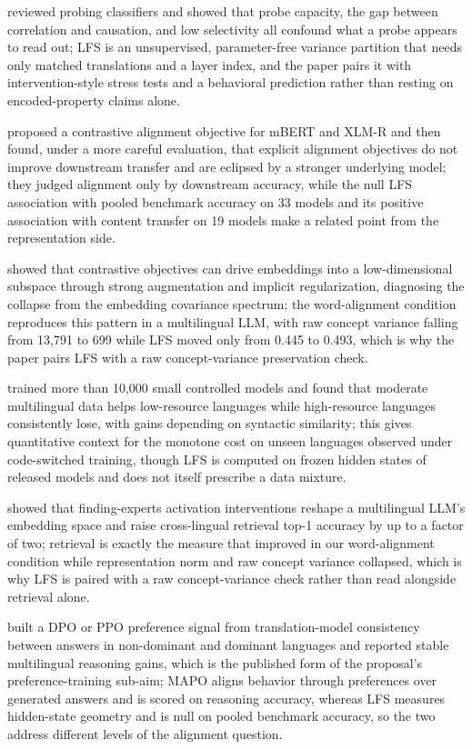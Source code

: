 \documentclass[11pt,a4paper]{article}
\begin{document}
\citet{belinkov2022probing} reviewed probing classifiers and showed that probe capacity, the gap between correlation and causation, and low selectivity all confound what a probe appears to read out; LFS is an unsupervised, parameter-free variance partition that needs only matched translations and a layer index, and the paper pairs it with intervention-style stress tests and a behavioral prediction rather than resting on encoded-property claims alone.

\citet{wu2020explicit} proposed a contrastive alignment objective for mBERT and XLM-R and then found, under a more careful evaluation, that explicit alignment objectives do not improve downstream transfer and are eclipsed by a stronger underlying model; they judged alignment only by downstream accuracy, while the null LFS association with pooled benchmark accuracy on 33 models and its positive association with content transfer on 19 models make a related point from the representation side.

\citet{jing2022collapse} showed that contrastive objectives can drive embeddings into a low-dimensional subspace through strong augmentation and implicit regularization, diagnosing the collapse from the embedding covariance spectrum; the word-alignment condition reproduces this pattern in a multilingual LLM, with raw concept variance falling from 13,791 to 699 while LFS moved only from 0.445 to 0.493, which is why the paper pairs LFS with a raw concept-variance preservation check.

\citet{chang2024curse} trained more than 10,000 small controlled models and found that moderate multilingual data helps low-resource languages while high-resource languages consistently lose, with gains depending on syntactic similarity; this gives quantitative context for the monotone cost on unseen languages observed under code-switched training, though LFS is computed on frozen hidden states of released models and does not itself prescribe a data mixture.

\citet{sundar2025steering} showed that finding-experts activation interventions reshape a multilingual LLM's embedding space and raise cross-lingual retrieval top-1 accuracy by up to a factor of two; retrieval is exactly the measure that improved in our word-alignment condition while representation norm and raw concept variance collapsed, which is why LFS is paired with a raw concept-variance check rather than read alongside retrieval alone.

\citet{she2024mapo} built a DPO or PPO preference signal from translation-model consistency between answers in non-dominant and dominant languages and reported stable multilingual reasoning gains, which is the published form of the proposal's preference-training sub-aim; MAPO aligns behavior through preferences over generated answers and is scored on reasoning accuracy, whereas LFS measures hidden-state geometry and is null on pooled benchmark accuracy, so the two address different levels of the alignment question.
\end{document}
